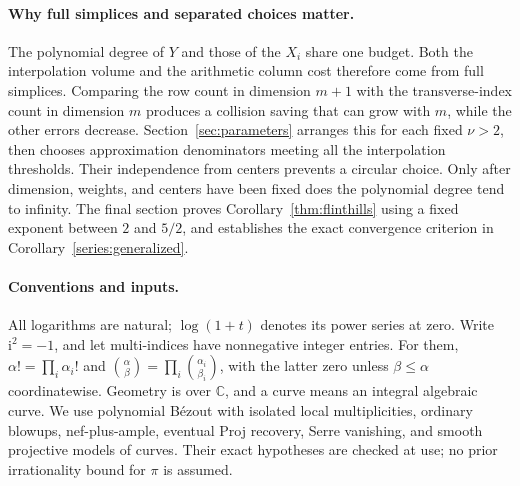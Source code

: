 \documentclass[11pt]{article}
\newcommand{\CC}{\mathbb C}
\newcommand{\ii}{\mathrm i}
\theoremstyle{definition}
\theoremstyle{remark}
\numberwithin{equation}{section}
\begin{document}
\paragraph{Why full simplices and separated choices matter.}
The polynomial degree of \(Y\) and those of the \(X_i\) share one
budget. Both the interpolation volume and the arithmetic column cost
therefore come from full simplices. Comparing the row count in dimension
\(m+1\) with the transverse-index count in dimension \(m\) produces
a collision saving that can grow with \(m\), while the other errors
decrease. Section~\ref{sec:parameters} arranges this for each fixed
\(\nu>2\), then chooses approximation denominators meeting all the
interpolation thresholds. Their independence from centers prevents a
circular choice. Only after dimension, weights, and centers have been
fixed does the polynomial degree tend to infinity. The final section
proves Corollary~\ref{thm:flinthills} using a fixed exponent between
\(2\) and \(5/2\), and establishes the exact convergence criterion in
Corollary~\ref{series:generalized}.

\paragraph{Conventions and inputs.}
All logarithms are natural; \(\log(1+t)\) denotes its power series at
zero. Write \(\ii^2=-1\), and let multi-indices have nonnegative
integer entries. For them, \(\alpha!=\prod_i\alpha_i!\) and
\(\binom\alpha\beta=\prod_i\binom{\alpha_i}{\beta_i}\), with the
latter zero unless \(\beta\le\alpha\) coordinatewise. Geometry is
over \(\CC\), and a curve means an integral algebraic curve. We use
polynomial B\'ezout with isolated local multiplicities, ordinary blowups,
nef-plus-ample, eventual Proj recovery, Serre vanishing, and smooth
projective models of curves. Their exact hypotheses are checked at use;
no prior irrationality bound for \(\pi\) is assumed.






\renewcommand{\bibfont}{\raggedright}


\end{document}
